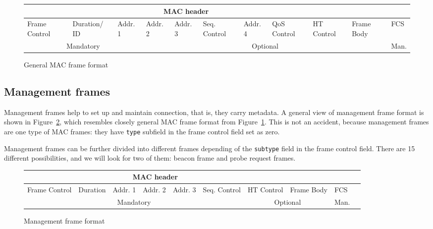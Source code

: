 \documentclass[12pt,a4paper,oneside,pdftex]{report}
\begin{document}
\begin{figure}
    \label{fig:general_mac_frame}
    \begin{tabular}{|p{1cm}|p{1cm}|p{1cm}|p{1cm}|p{1cm}|p{1cm}|p{1cm}|p{1cm}|p{1cm}|p{1cm}|p{0.8cm}|}
    
        \multicolumn{9}{|c|}{MAC header} &
        \multicolumn{2}{c|}{ } \\
    \hline 
        Frame Control &
        Dura\-tion/ ID &
        Addr. 1 &
        Addr. 2 &
        Addr. 3 &
        Seq. Control &
        Addr. 4 &
        QoS Control &
        HT Control &
        Frame Body &
        FCS \\
    \hline 
        \multicolumn{3}{|c|}{Mandatory} &
        \multicolumn{7}{c|}{Optional} &
        Man. \\

    \end{tabular}

    \caption{General MAC frame format}
\end{figure}


\subsection{Management frames}
\label{subsec:management_frames}

Management frames help to set up and maintain connection, that is, they carry metadata. A general view of management frame format is shown in Figure~\ref{fig:management_frame}, which resembles closely general MAC frame format from Figure~\ref{fig:general_mac_frame}. This is not an accident, because management frames are one type of MAC frames: they have \texttt{type} subfield in the frame control field set as zero.

Management frames can be further divided into different frames depending of the \texttt{subtype} field in the frame control field. There are 15 different possibilities, and we will look for two of them: beacon frame and probe request frames.

\begin{figure}
    \label{fig:management_frame}
    \begin{tabular}{|p{1cm}|p{1cm}|p{1cm}|p{1cm}|p{1cm}|p{1cm}|p{1cm}|p{1cm}|p{1cm}|p{1cm}|}
    
        \multicolumn{7}{|c|}{MAC header} &
        \multicolumn{2}{c|}{ } \\
    \hline 
        Frame Control &
        Dura\-tion &
        Addr. 1 &
        Addr. 2 &
        Addr. 3 &
        Seq. Control &
        HT Control &
        Frame Body &
        FCS \\
    \hline 
        \multicolumn{6}{|c|}{Mandatory} &
        \multicolumn{2}{c|}{Optional} &
        Man. \\

    \end{tabular}

    \caption{Management frame format}
\end{figure}
\end{document}
